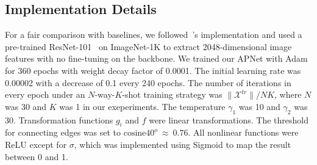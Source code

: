 \documentclass[letterpaper]{article} %
\begin{document}




\subsection{Implementation Details}
For a fair comparison with baselines, we followed~\cite{xian2018zero}'s implementation and used a pre-trained ResNet-101~\cite{he2016deep} on ImageNet-1K to extract 2048-dimensional image features with no fine-tuning on the backbone. We trained our APNet with Adam~\cite{kingma2015adam} for 360 epochs with weight decay factor of 0.0001. The initial learning rate was 0.00002 with a decrease of 0.1 every 240 epochs. The number of iterations in every epoch under an $N$-way-$K$-shot training strategy was $\|\mathcal{X}^{tr}\| / NK$, where $N$ was 30 and $K$ was 1 in our exeperiments.
The temperature $\gamma_{1}$ was 10 and $\gamma_{2}$ was 30.
Transformation functions $g_{i}$ and $f$ were linear transformations.
The threshold for connecting edges was set to $\textrm{cosine}40^{o}~\approx~0.76$. All nonlinear functions were ReLU except for $\sigma$, which was implemented using Sigmoid to map the result between 0 and 1.


\end{document}
